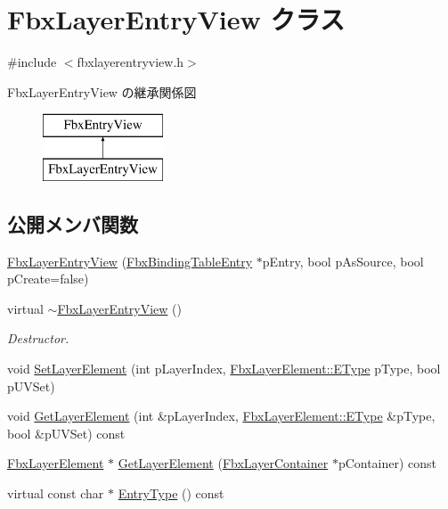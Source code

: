 \hypertarget{class_fbx_layer_entry_view}{}\section{Fbx\+Layer\+Entry\+View クラス}
\label{class_fbx_layer_entry_view}


{\ttfamily \#include $<$fbxlayerentryview.\+h$>$}

Fbx\+Layer\+Entry\+View の継承関係図\begin{figure}[H]
\begin{center}
\leavevmode
\includegraphics[height=2.000000cm]{class_fbx_layer_entry_view}
\end{center}
\end{figure}
\subsection*{公開メンバ関数}
\begin{DoxyCompactItemize}
\item 
\hyperlink{class_fbx_layer_entry_view_a7c5fc0472d0b3d60d0207acc80751daf}{Fbx\+Layer\+Entry\+View} (\hyperlink{class_fbx_binding_table_entry}{Fbx\+Binding\+Table\+Entry} $\ast$p\+Entry, bool p\+As\+Source, bool p\+Create=false)
\item 
virtual \hyperlink{class_fbx_layer_entry_view_abe013d4f54533ea6e71ab784ca73056b}{$\sim$\+Fbx\+Layer\+Entry\+View} ()
\begin{DoxyCompactList}\small\item\em Destructor. \end{DoxyCompactList}\item 
void \hyperlink{class_fbx_layer_entry_view_ae3eaf64e7fdcb66e750ec72627589fdf}{Set\+Layer\+Element} (int p\+Layer\+Index, \hyperlink{class_fbx_layer_element_a8c95c5cd880b56c776acd379bd86f42c}{Fbx\+Layer\+Element\+::\+E\+Type} p\+Type, bool p\+U\+V\+Set)
\item 
void \hyperlink{class_fbx_layer_entry_view_a7301db4c7de8b6ac87ba458f9f216a79}{Get\+Layer\+Element} (int \&p\+Layer\+Index, \hyperlink{class_fbx_layer_element_a8c95c5cd880b56c776acd379bd86f42c}{Fbx\+Layer\+Element\+::\+E\+Type} \&p\+Type, bool \&p\+U\+V\+Set) const
\item 
\hyperlink{class_fbx_layer_element}{Fbx\+Layer\+Element} $\ast$ \hyperlink{class_fbx_layer_entry_view_a6350eba678ba5911cd536f0ed9d740a6}{Get\+Layer\+Element} (\hyperlink{class_fbx_layer_container}{Fbx\+Layer\+Container} $\ast$p\+Container) const
\item 
virtual const char $\ast$ \hyperlink{class_fbx_layer_entry_view_a283d8f57e186dd36c88589dc3f37a35e}{Entry\+Type} () const
\end{DoxyCompactItemize}

